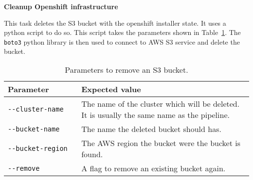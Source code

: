 \textbf{Cleanup Openshift infrastructure}

This task deletes the S3 bucket with the openshift installer state.
It uses a python script to do so.
This script takes the parameters shown in Table~\ref{tab:params-remove-s3-bucket}.
The \verb|boto3| python library is then used to connect to AWS S3 service and delete the bucket.

\begin{table}[H]
    \centering
    \caption{Parameters to remove an S3 bucket.}
    \label{tab:params-remove-s3-bucket}
    \begin{tabular}{p{0.3\linewidth}|p{0.7\linewidth}}
        Parameter & Expected value \\
        \hline
        \verb|--cluster-name| & The name of the cluster which will be deleted.
            It is usually the same name as the pipeline. \\
        \verb|--bucket-name| & The name the deleted bucket should has. \\
        \verb|--bucket-region| & The AWS region the bucket were the bucket is found. \\
        \verb|--remove| & A flag to remove an existing bucket again. \\
    \end{tabular}
\end{table}

